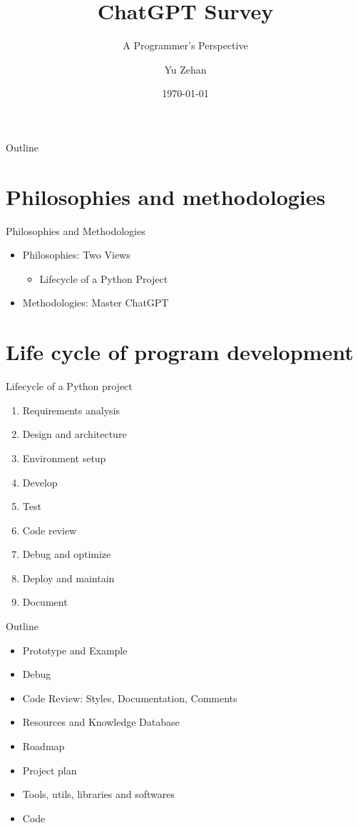 \documentclass{beamer}
\title{ChatGPT Survey}
\subtitle{A Programmer's Perspective}
\author{Yu Zehan}
\institute{Intel FLEX}
\date{\today}
\begin{document}
\begin{frame}
  \titlepage
\end{frame}

\begin{frame}{Outline}
  \tableofcontents
\end{frame}

\section{Philosophies and methodologies}
\begin{frame}{Philosophies and Methodologies}
  \begin{itemize}
    \item Philosophies: Two Views
    \begin{itemize}
      \item Lifecycle of a Python Project
    \end{itemize}
    \item Methodologies: Master ChatGPT
  \end{itemize}
\end{frame}

\section{Life cycle of program development}
\begin{frame}{Lifecycle of a Python project}
  \begin{enumerate}
  \item Requirements analysis
  \item Design and architecture
  \item Environment setup
  \item Develop
  \item Test
  \item Code review
  \item Debug and optimize
  \item Deploy and maintain
  \item Document
\end{enumerate}
\end{frame}

\begin{frame}{Outline}
  \begin{itemize}
    \item Prototype and Example
    \item Debug
    \item Code Review: Styles, Documentation, Comments
    \item Resources and Knowledge Database
    \item Roadmap
    \item Project plan
    \item Tools, utils, libraries and softwares
    \item Code \cite{coding-prompts}
  \end{itemize}
\end{frame}
\end{document}

